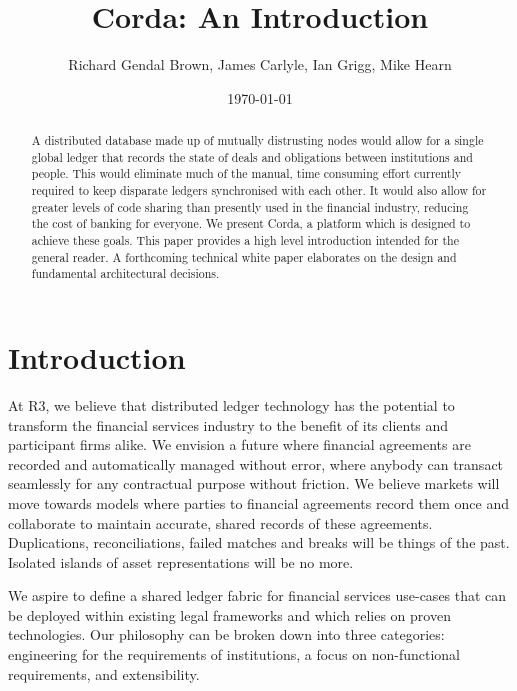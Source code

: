 \documentclass{article}
\author{Richard Gendal Brown, James Carlyle, Ian Grigg, Mike Hearn}
\date{\today}
\title{Corda: An Introduction}
\begin{document}
\maketitle 



\begin{abstract}

A distributed database made up of mutually distrusting nodes would allow for a single global ledger that records the state of deals and obligations between institutions and people. This would eliminate much of the manual, time consuming effort currently required to keep disparate ledgers synchronised with each other. It would also allow for greater levels of code sharing than presently used in the financial industry, reducing the cost of banking for everyone. We present Corda, a platform which is designed to achieve these goals. This paper provides a high level introduction intended for the general reader. A forthcoming technical white paper elaborates on the design and fundamental architectural decisions.
\end{abstract}
\newpage
\tableofcontents
\newpage
\section{Introduction}
At R3, we believe that distributed ledger technology has the potential to transform the financial services industry to the benefit of its clients and participant firms alike. We envision a future where financial agreements are recorded and automatically managed without error, where anybody can transact seamlessly for any contractual purpose without friction. We believe markets will move towards models where parties to financial agreements record them once and collaborate to maintain accurate, shared records of these agreements. Duplications, reconciliations, failed matches and breaks will be things of the past. Isolated islands of asset representations will be no more.

We aspire to define a shared ledger fabric for financial services use-cases that can be deployed within existing legal frameworks and which relies on proven technologies. Our philosophy can be broken down into three categories: engineering for the requirements of institutions, a focus on non-functional requirements, and extensibility.
\end{document}
